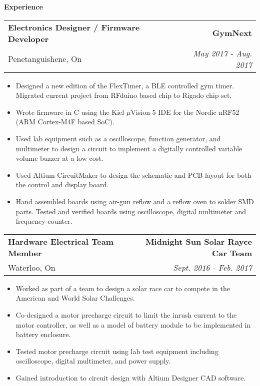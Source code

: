 \documentclass[letterpaper,10pt]{article}
\makeatletter
\newcommand{\resitem}[1]{\item #1 \vspace{-2pt}}
\newcommand{\resheading}[1]{{\large \colorbox{mygrey}{\begin{minipage}{\textwidth}{\textbf{#1 \vphantom{p\^{E}}}}\end{minipage}}}}
\newcommand{\ressubheading}[4]{
    \begin{tabular*}{7in}{l@{\extracolsep{\fill}}r}
    		\textbf{#1} & #2 \\
    		 #3 		& \textit{#4} \\
    \end{tabular*}\vspace{-6pt}}
\makeatother
\begin{document}
\resheading{Experience}
	\begin{samepage}
		\ressubheading{Electronics Designer / Firmware Developer}{\textbf{GymNext}}{Penetanguishene, On}{May 2017 - Aug. 2017}
		\begin{itemize}
			\resitem{Designed a new edition of the FlexTimer, a BLE controlled gym timer. Migrated current project from RFduino based chip to Rigado chip set.}
			\resitem{Wrote firmware in C using the Kiel $\mu$Vision 5 IDE for the Nordic nRF52 (ARM Cortex-M4F based SoC).}
			\resitem{Used lab equipment such as a oscilloscope, function generator, and multimeter to design a circuit to implement a digitally controlled variable volume buzzer at a low cost.}
			\resitem{Used Altium CircuitMaker to design the schematic and PCB layout for both the control and display board.}
			\resitem{Hand assembled boards using air-gun reflow and a reflow oven to solder SMD parts. Tested and verified boards using oscilloscope, digital multimeter and frequency counter. }
		\end{itemize}
	\end{samepage}
    \begin{samepage}
        \ressubheading{Hardware Electrical Team Member}{\textbf{Midnight Sun Solar Rayce Car Team}}{Waterloo, On}{Sept. 2016 - Feb. 2017}
        \begin{itemize}
            \resitem{Worked as part of a team to design a solar race car to compete in the American and World Solar Challenges.}
            \resitem{Co-designed a motor precharge circuit to limit the inrush current to the motor controller, as well as a model of battery module to be implemented in battery enclosure.}
            \resitem{Tested motor precharge circuit using lab test equipment including oscilloscope, digital multimeter, and power supply.}
            \resitem{Gained introduction to circuit design with Altium Designer CAD software.}
        \end{itemize}
    \end{samepage}
\end{document}
